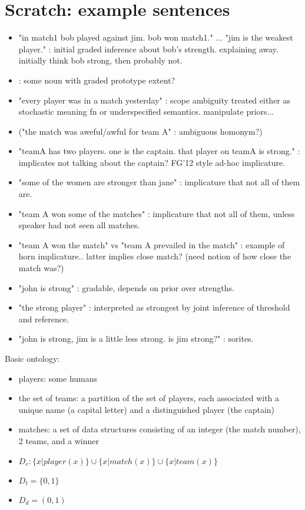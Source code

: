 \documentclass[12pt]{article}
\begin{document}
\section{Scratch: example sentences}
\begin{itemize}
\item "in match1 bob played against jim. bob won match1." ... "jim is the weakest player." : initial graded inference about bob's strength. explaining away. initially think bob strong, then probably not.
\item : some noun with graded  prototype extent?
\item "every player was in a match yesterday" : scope ambiguity treated either as stochastic meaning fn or underspecified semantics. manipulate priors...
\item ("the match was aweful/awful for team A" : ambiguous homonym?)
\item "teamA has two players. one is the captain. that player on teamA is strong." : implicates not talking about the captain?  FG'12 style ad-hoc implicature.
\item "some of the women are stronger than jane" : implicature that not all of them are.
\item "team A won some of the matches" : implicature that not all of them, unless speaker had not seen all matches.
\item "team A won the match" vs "team A prevailed in the match" : example of horn implicature.. latter implies close match? (need notion of how close the match was?)
\item "john is strong" : gradable, depends on prior over strengths.
\item "the strong player" : interpreted as strongest by joint inference of threshold and reference.
\item "john is strong, jim is a little less strong. is jim strong?" : sorites.
\end{itemize}

\noindent Basic ontology: 
\begin{itemize}
\item players: some humans
\item the set of teams: a partition of the set of players, each associated with a unique name (a capital letter) and a distinguished player (the captain)
\item matches: a set of data structures consisting of an integer (the match number), 2 teams, and a winner
\item $D_e: \{x|\mathit{player}(x)\} \cup \{x|\mathit{match}(x)\} \cup \{x|\mathit{team}(x)\}$
\item $D_t = \{0,1\}$
\item $D_d = (0,1)$
\end{itemize}
\end{document}
